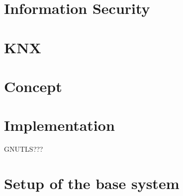 \documentclass[a4paper,12pt,oneside,openright]{memoir}
\begin{document}
\chapter{Information Security}
\label{ch:SOAcryptography}





\chapter{KNX}
\label{ch:knx}






\chapter{Concept}
\label{ch:security}



\chapter{Implementation}
\label{ch:implementation}


GNUTLS???

\appendix

\nocite{*}	%

\chapter{Setup of the base system}
\label{ch:basesystem}


\printglossary
\printbibliography
\end{document}
